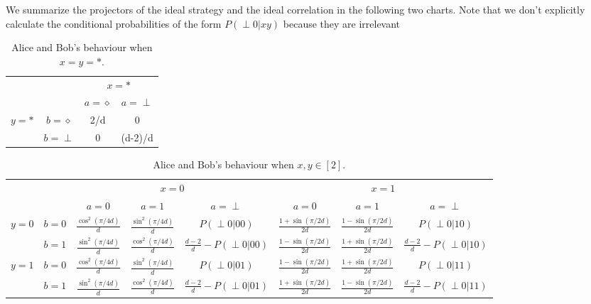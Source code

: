 \documentclass[11pt,letterpaper]{article}
\newcommand{\1}{\mathbb{1}}
\newcommand{\pr}[2]{P(#1|#2)}
\theoremstyle{definition}
\begin{document}
We summarize the projectors of the ideal strategy and the ideal correlation in the following two charts.
Note that we don't explicitly calculate the conditional probabilities of the form $\pr{\perp 0}{xy}$ because they are irrelevant
\begin{table}[H]
\begin{center}
\begin{tabular}{|c|c||c|c|}
\hline
\multicolumn{2}{|c|}{} &
\multicolumn{2}{|c|}{$x=\ast$}\\
\cline{3-4}
\multicolumn{2}{|c|}{} &$a = \diamond$ & $a = \perp$ \\
\hline
\hline
\multirow{2}{*}{$y = \ast$} & $b=\diamond$ & 2/d & 0 \\
\cline{2-4}
&$b=\perp$ & 0 & (d-2)/d \\
\hline
\end{tabular}
\caption{Alice and Bob's behaviour when $x=y=\ast$.}
\end{center}
\end{table}

\begin{table}[H]
\begin{center}
\begin{tabular}{|c|c||c|c|c|c|c|c|}
\hline
\multicolumn{2}{|c|}{} &
\multicolumn{3}{|c|}{$x=0$}&
\multicolumn{3}{|c|}{$x=1$} \\
\cline{3-8}
\multicolumn{2}{|c|}{} &
$a = 0$ & $a=1$ & $a=\perp$ &
$a = 0$ & $a=1$ & $a=\perp$\\
\hline
\hline
\multirow{2}{*}{$y = 0$} & $b=0$ & $\frac{\cos^2(\pi/4d)}{d}$ & $\frac{\sin^2(\pi/4d)}{d}$ & \small $\pr{\perp0}{00}$ 
& $\frac{1+\sin(\pi/2d)}{2d}$ & $\frac{1-\sin(\pi/2d)}{2d}$ & \small  $\pr{\perp0}{10}$ \\
\cline{2-8}
&$b=1$ & $\frac{\sin^2(\pi/4d)}{d}$ & $\frac{\cos^2(\pi/4d)}{d}$ & $\frac{d-2}{d}-\pr{\perp0}{00}$ 
&  $\frac{1-\sin(\pi/2d)}{2d}$ & $\frac{1+\sin(\pi/2d)}{2d}$ & \small $\frac{d-2}{d} - \pr{\perp0}{10}$  \\
\hline
\multirow{2}{*}{$y = 1$} & $b=0$ & $\frac{\cos^2(\pi/4d)}{d}$ & $\frac{\sin^2(\pi/4d)}{d}$ & \small $\pr{\perp0}{01}$ & 
$ \frac{1-\sin(\pi/2d)}{2d}$ & $ \frac{1+\sin(\pi/2d)}{2d}$ & \small $\pr{\perp 0}{11}$  \\
\cline{2-8}
&$b=1$ & $\frac{\sin^2(\pi/4d)}{d}$ & $\frac{\cos^2(\pi/4d)}{d}$ & \small $\frac{d-2}{d}-\pr{\perp0}{01}$ &  
$ \frac{1+\sin(\pi/2d)}{2d}$ & $ \frac{1-\sin(\pi/2d)}{2d}$ & \small $\frac{d-2}{d}- \pr{\perp 0}{11}$ \\
\hline
\end{tabular}
\end{center}
\caption{Alice and Bob's behaviour when $x,y \in [2]$.}
\end{table}
\end{document}
